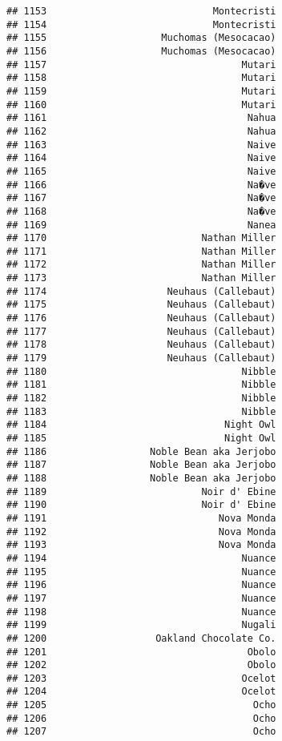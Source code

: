 \documentclass[
]{article}
\begin{document}
\begin{verbatim}
## 1153                             Montecristi
## 1154                             Montecristi
## 1155                    Muchomas (Mesocacao)
## 1156                    Muchomas (Mesocacao)
## 1157                                  Mutari
## 1158                                  Mutari
## 1159                                  Mutari
## 1160                                  Mutari
## 1161                                   Nahua
## 1162                                   Nahua
## 1163                                   Naive
## 1164                                   Naive
## 1165                                   Naive
## 1166                                   Na�ve
## 1167                                   Na�ve
## 1168                                   Na�ve
## 1169                                   Nanea
## 1170                           Nathan Miller
## 1171                           Nathan Miller
## 1172                           Nathan Miller
## 1173                           Nathan Miller
## 1174                     Neuhaus (Callebaut)
## 1175                     Neuhaus (Callebaut)
## 1176                     Neuhaus (Callebaut)
## 1177                     Neuhaus (Callebaut)
## 1178                     Neuhaus (Callebaut)
## 1179                     Neuhaus (Callebaut)
## 1180                                  Nibble
## 1181                                  Nibble
## 1182                                  Nibble
## 1183                                  Nibble
## 1184                               Night Owl
## 1185                               Night Owl
## 1186                  Noble Bean aka Jerjobo
## 1187                  Noble Bean aka Jerjobo
## 1188                  Noble Bean aka Jerjobo
## 1189                           Noir d' Ebine
## 1190                           Noir d' Ebine
## 1191                              Nova Monda
## 1192                              Nova Monda
## 1193                              Nova Monda
## 1194                                  Nuance
## 1195                                  Nuance
## 1196                                  Nuance
## 1197                                  Nuance
## 1198                                  Nuance
## 1199                                  Nugali
## 1200                   Oakland Chocolate Co.
## 1201                                   Obolo
## 1202                                   Obolo
## 1203                                  Ocelot
## 1204                                  Ocelot
## 1205                                    Ocho
## 1206                                    Ocho
## 1207                                    Ocho

\end{verbatim}
\end{document}
